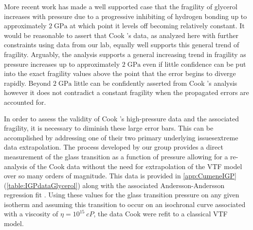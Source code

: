 	More recent work has made a well supported case that the fragility of glycerol increases with pressure due to a progressive inhibiting of hydrogen bonding up to approximately $2\;\si{\giga\pascal}$ at which point it levels off becoming relatively constant.  It would be reasonable to assert that Cook \etal's data, as analyzed here with further constraints using data from our lab, equally well supports this general trend of fragility.  Arguably, the analysis supports a general increasing trend in fragility as pressure increases up to approximately $2\;\si{\giga\pascal}$ even if little confidence can be put into the exact fragility values above the point that the error begins to diverge rapidly.  Beyond $2\;\si{\giga\pascal}$ little can be confidently asserted from Cook \etal's analysis however it does not contradict a constant fragility when the propagated errors are accounted for.  
	
	In order to assess the validity of Cook \etal's high-pressure data and the associated fragility, it is necessary to diminish these large error bars.  This can be accomplished by addressing one of their two primary underlying issues\textemdash extreme data extrapolation.  The \tgp process developed by our group provides a direct measurement of the glass transition as a function of pressure allowing for a re-analysis of the Cook \etal data without the need for extrapolation of the VTF model over so many orders of magnitude.  This \tgp data is provided in \app\nolinebreak \ref{app:CumeneIGP} (\tbl\nolinebreak \ref{table:IGPdataGlycerol}) along with the associated Andersson-Andersson regression fit \cite{Andersson}.  Using these values for the glass transition pressure on any given isotherm and assuming this transition to occur on an isochronal curve associated with a viscosity of $\eta=10^{15}~cP$, the data Cook \etal were refit to a classical VTF model. 	
	
